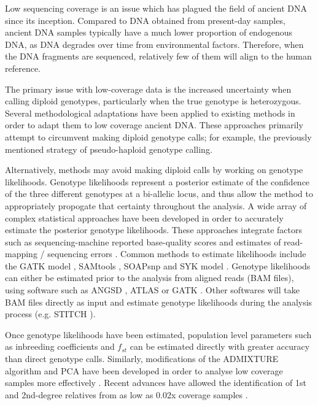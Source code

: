 Low sequencing coverage is an issue which has plagued the field of ancient DNA since its inception. Compared to DNA obtained from present-day samples, ancient DNA samples typically have a much lower proportion of endogenous DNA, as DNA degrades over time from environmental factors. Therefore, when the DNA fragments are sequenced, relatively few of them will align to the human reference. 

The primary issue with low-coverage data is the increased uncertainty when calling diploid genotypes, particularly when the true genotype is heterozygous. Several methodological adaptations have been applied to existing methods in order to adapt them to low coverage ancient DNA. These approaches primarily attempt to circumvent making diploid genotype calls; for example, the previously mentioned strategy of pseudo-haploid genotype calling.

Alternatively, methods may avoid making diploid calls by working on genotype likelihoods. Genotype likelihoods represent a posterior estimate of the confidence of the three different genotypes at a bi-allelic locus, and thus allow the method to appropriately propogate that certainty throughout the analysis. A wide array of complex statistical approaches have been developed in order to accurately estimate the posterior genotype likelihoods. These approaches integrate factors such as sequencing-machine reported base-quality scores and estimates of read-mapping / sequencing errors \cite{McKenna2010}. Common methods to estimate likelihoods include the GATK model \cite{VanderAuwera2013}, SAMtools \cite{Li2009}, SOAPsnp \cite{Li2009a} and SYK model \cite{Kim2011}. Genotype likelihoods can either be estimated prior to the analysis from aligned reads (BAM files), using software such as ANGSD \cite{Korneliussen2014}, ATLAS \cite{Link2017} or GATK \cite{VanderAuwera2013}. Other softwares will take BAM files directly as input and estimate genotype likelihoods during the analysis process (e.g. STITCH \cite{Davies2016}). 

Once genotype likelihoods have been estimated, population level parameters such as inbreeding coefficients and $f_{st}$ can be estimated directly \cite{Korneliussen2014} with greater accuracy than direct genotype calls. Similarly, modifications of the ADMIXTURE \cite{Alexander2009} algorithm and PCA have been developed in order to analyse low coverage samples more effectively \cite{skotte2013estimating, zhang2021novel}. Recent advances have allowed the identification of 1st and 2nd-degree relatives from as low as 0.02x coverage samples \cite{fernandes2017identification, fernandes2021tkgwv2}. 

